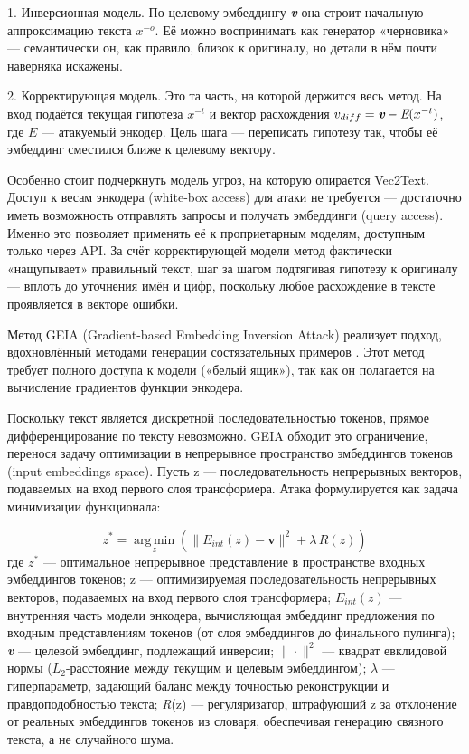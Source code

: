 \documentclass[a4paper, 12pt, oneside, openany]{article}
\begin{document}
1. Инверсионная модель. По целевому эмбеддингу \emph{\textbf{v}} она строит начальную аппроксимацию текста $x^{-o}$. Её можно воспринимать как генератор «черновика» — семантически он, как правило, близок к оригиналу, но детали в нём почти наверняка искажены.

2. Корректирующая модель. Это та часть, на которой держится весь метод. На вход подаётся текущая гипотеза $x^{-t}$ и вектор расхождения \(v_{diff} = \emph{\textbf{v}} - \emph{E}(x^{-t})\), где $E$ — атакуемый энкодер. Цель шага — переписать гипотезу так, чтобы её эмбеддинг сместился ближе к целевому вектору.

Особенно стоит подчеркнуть модель угроз, на которую опирается Vec2Text. Доступ к весам энкодера (white-box access) для атаки не требуется — достаточно иметь возможность отправлять запросы и получать эмбеддинги (query access). Именно это позволяет применять её к проприетарным моделям, доступным только через API. За счёт корректирующей модели метод фактически «нащупывает» правильный текст, шаг за шагом подтягивая гипотезу к оригиналу — вплоть до уточнения имён и цифр, поскольку любое расхождение в тексте проявляется в векторе ошибки.

Метод GEIA (Gradient-based Embedding Inversion Attack) реализует подход, вдохновлённый методами генерации состязательных примеров \cite{ref7}. Этот метод требует полного доступа к модели («белый ящик»), так как он полагается на вычисление градиентов функции энкодера.

Поскольку текст является дискретной последовательностью токенов, прямое дифференцирование по тексту невозможно. GEIA обходит это ограничение, перенося задачу оптимизации в непрерывное пространство эмбеддингов токенов (input embeddings space). Пусть z --- последовательность непрерывных векторов, подаваемых на вход первого слоя трансформера. Атака формулируется как задача минимизации функционала:

\begin{equation}
	z^{*} = \operatorname*{arg\,min}_{z}\left( \| E_{int}(z) - \mathbf{v} \|^{2} + \lambda\, R(z) \right)
	\label{eq:1-7}
\end{equation}
где $z^*$ --- оптимальное непрерывное представление в пространстве входных эмбеддингов токенов; z --- оптимизируемая последовательность непрерывных векторов, подаваемых на вход первого слоя трансформера; \(E_{int}(z)\) --- внутренняя часть модели энкодера, вычисляющая эмбеддинг предложения по входным представлениям токенов (от слоя эмбеддингов до финального пулинга); \emph{\textbf{v}} --- целевой эмбеддинг, подлежащий инверсии; $\|\cdot\|^2$ --- квадрат евклидовой нормы ($L_2$-расстояние между текущим и целевым эмбеддингом); $\lambda$ --- гиперпараметр, задающий баланс между точностью реконструкции и правдоподобностью текста; \emph{R}(z) --- регуляризатор, штрафующий z за отклонение от реальных эмбеддингов токенов из словаря, обеспечивая генерацию связного текста, а не случайного шума.
\end{document}

